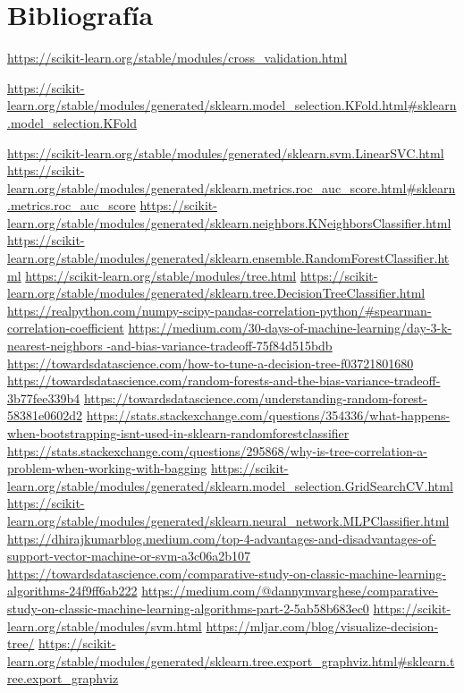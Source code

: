 \documentclass[a4paper,11pt]{article}
\begin{document}
\section{Bibliografía}
\begin{thebibliography}{9}
\url{https://scikit-learn.org/stable/modules/cross\_validation.html}

\url{https://scikit-learn.org/stable/modules/generated/sklearn.model\_selection.KFold.html\#sklearn.model\_selection.KFold}

\url{https://scikit-learn.org/stable/modules/generated/sklearn.svm.LinearSVC.html}
\url{https://scikit-learn.org/stable/modules/generated/sklearn.metrics.roc\_auc\_score.html\#sklearn.metrics.roc\_auc\_score}
\url{https://scikit-learn.org/stable/modules/generated/sklearn.neighbors.KNeighborsClassifier.html}
\url{https://scikit-learn.org/stable/modules/generated/sklearn.ensemble.RandomForestClassifier.html}
\url{https://scikit-learn.org/stable/modules/tree.html}
\url{https://scikit-learn.org/stable/modules/generated/sklearn.tree.DecisionTreeClassifier.html}
\url{https://realpython.com/numpy-scipy-pandas-correlation-python/\#spearman-correlation-coefficient}
\url{https://medium.com/30-days-of-machine-learning/day-3-k-nearest-neighbors
-and-bias-variance-tradeoff-75f84d515bdb}
\url{https://towardsdatascience.com/how-to-tune-a-decision-tree-f03721801680}
\url{https://towardsdatascience.com/random-forests-and-the-bias-variance-tradeoff-3b77fee339b4}
\url{https://towardsdatascience.com/understanding-random-forest-58381e0602d2}
\url{https://stats.stackexchange.com/questions/354336/what-happens-when-bootstrapping-isnt-used-in-sklearn-randomforestclassifier}
\url{https://stats.stackexchange.com/questions/295868/why-is-tree-correlation-a-problem-when-working-with-bagging}
\url{https://scikit-learn.org/stable/modules/generated/sklearn.model\_selection.GridSearchCV.html}
\url{https://scikit-learn.org/stable/modules/generated/sklearn.neural\_network.MLPClassifier.html}
\url{https://dhirajkumarblog.medium.com/top-4-advantages-and-disadvantages-of-support-vector-machine-or-svm-a3c06a2b107}
\url{https://towardsdatascience.com/comparative-study-on-classic-machine-learning-algorithms-24f9ff6ab222}
\url{https://medium.com/@dannymvarghese/comparative-study-on-classic-machine-learning-algorithms-part-2-5ab58b683ec0}
\url{https://scikit-learn.org/stable/modules/svm.html}
\url{https://mljar.com/blog/visualize-decision-tree/}
\url{https://scikit-learn.org/stable/modules/generated/sklearn.tree.export\_graphviz.html\#sklearn.tree.export\_graphviz}

\end{thebibliography}
\end{document}
